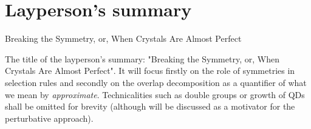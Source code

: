 \section{Layperson's summary}

\begin{center}
\begin{huge}
Breaking the Symmetry, or, When Crystals Are Almost Perfect
\end{huge}
\end{center}

The title of the layperson's summary: "Breaking the Symmetry, or, When Crystals Are Almost Perfect". It will focus firstly on the role of symmetries in selection rules and secondly on the overlap decomposition as a quantifier of what we mean by \textit{approximate}. Technicalities such as double groups or growth of QDs shall be omitted for brevity (although \cite{hexagon} will be discussed as a motivator for the perturbative approach).


